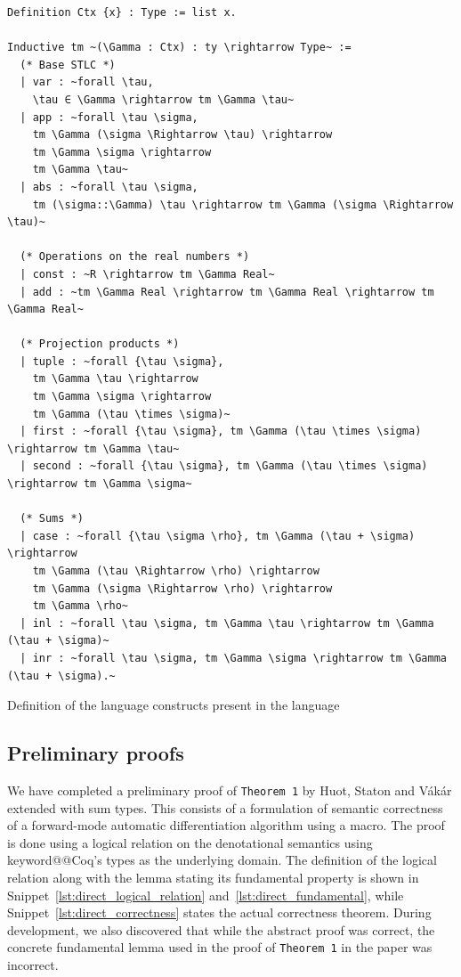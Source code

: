 \documentclass[11pt, final]{article}
\makeatletter
\def\Vakar{V\'{a}k\'{a}r}
\def\<#1>{\csname keyword@@#1\endcsname}
\makeatother
\begin{document}
\begin{listing}
  \begin{verbatim}
Definition Ctx {x} : Type := list x.

Inductive tm ~(\Gamma : Ctx) : ty \rightarrow Type~ :=
  (* Base STLC *)
  | var : ~forall \tau,
    \tau ∈ \Gamma \rightarrow tm \Gamma \tau~
  | app : ~forall \tau \sigma,
    tm \Gamma (\sigma \Rightarrow \tau) \rightarrow
    tm \Gamma \sigma \rightarrow
    tm \Gamma \tau~
  | abs : ~forall \tau \sigma,
    tm (\sigma::\Gamma) \tau \rightarrow tm \Gamma (\sigma \Rightarrow \tau)~

  (* Operations on the real numbers *)
  | const : ~R \rightarrow tm \Gamma Real~
  | add : ~tm \Gamma Real \rightarrow tm \Gamma Real \rightarrow tm \Gamma Real~

  (* Projection products *)
  | tuple : ~forall {\tau \sigma},
    tm \Gamma \tau \rightarrow
    tm \Gamma \sigma \rightarrow
    tm \Gamma (\tau \times \sigma)~
  | first : ~forall {\tau \sigma}, tm \Gamma (\tau \times \sigma) \rightarrow tm \Gamma \tau~
  | second : ~forall {\tau \sigma}, tm \Gamma (\tau \times \sigma) \rightarrow tm \Gamma \sigma~

  (* Sums *)
  | case : ~forall {\tau \sigma \rho}, tm \Gamma (\tau + \sigma) \rightarrow
    tm \Gamma (\tau \Rightarrow \rho) \rightarrow
    tm \Gamma (\sigma \Rightarrow \rho) \rightarrow
    tm \Gamma \rho~
  | inl : ~forall \tau \sigma, tm \Gamma \tau \rightarrow tm \Gamma (\tau + \sigma)~
  | inr : ~forall \tau \sigma, tm \Gamma \sigma \rightarrow tm \Gamma (\tau + \sigma).~

  \end{verbatim}
  \caption{Definition of the language constructs present in the language}
  \label{lst:stlc_terms}
\end{listing}

\subsection{Preliminary proofs}

We have completed a preliminary proof of \texttt{Theorem 1} by Huot, Staton and \Vakar{}\cite{huot2020correctness} extended with sum types.
This consists of a formulation of semantic correctness of a forward-mode automatic differentiation algorithm using a macro.
The proof is done using a logical relation on the denotational semantics using \<Coq>'s types as the underlying domain.
The definition of the logical relation along with the lemma stating its fundamental property is shown in Snippet~\ref{lst:direct_logical_relation} and~\ref{lst:direct_fundamental}, while Snippet~\ref{lst:direct_correctness} states the actual correctness theorem.
During development, we also discovered that while the abstract proof was correct, the concrete fundamental lemma used in the proof of \texttt{Theorem 1} in the paper was incorrect.
\end{document}
